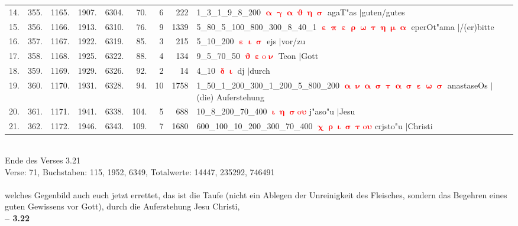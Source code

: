 \documentclass[a4paper,10pt,landscape]{article}
\begin{document}
\begin{tabular}{rrrrrrrrp{120mm}}
14.&355.&1165.&1907.&6304.&70.&6&222&1\_3\_1\_9\_8\_200 \textcolor{red}{$\boldsymbol{\upalpha\upgamma\upalpha\upvartheta\upeta\upsigma}$} agaT"as $|$guten/gutes\\
15.&356.&1166.&1913.&6310.&76.&9&1339&5\_80\_5\_100\_800\_300\_8\_40\_1 \textcolor{red}{$\boldsymbol{\upepsilon\uppi\upepsilon\uprho\upomega\uptau\upeta\upmu\upalpha}$} eperOt"ama $|$/(er)bitte\\
16.&357.&1167.&1922.&6319.&85.&3&215&5\_10\_200 \textcolor{red}{$\boldsymbol{\upepsilon\upiota\upsigma}$} ejs $|$vor/zu\\
17.&358.&1168.&1925.&6322.&88.&4&134&9\_5\_70\_50 \textcolor{red}{$\boldsymbol{\upvartheta\upepsilon\mathrm{o}\upnu}$} Teon $|$Gott\\
18.&359.&1169.&1929.&6326.&92.&2&14&4\_10 \textcolor{red}{$\boldsymbol{\updelta\upiota}$} dj $|$durch\\
19.&360.&1170.&1931.&6328.&94.&10&1758&1\_50\_1\_200\_300\_1\_200\_5\_800\_200 \textcolor{red}{$\boldsymbol{\upalpha\upnu\upalpha\upsigma\uptau\upalpha\upsigma\upepsilon\upomega\upsigma}$} anastaseOs $|$(die) Auferstehung\\
20.&361.&1171.&1941.&6338.&104.&5&688&10\_8\_200\_70\_400 \textcolor{red}{$\boldsymbol{\upiota\upeta\upsigma\mathrm{o}\upsilon}$} j"aso"u $|$Jesu\\
21.&362.&1172.&1946.&6343.&109.&7&1680&600\_100\_10\_200\_300\_70\_400 \textcolor{red}{$\boldsymbol{\upchi\uprho\upiota\upsigma\uptau\mathrm{o}\upsilon}$} crjsto"u $|$Christi\\
\end{tabular}\medskip \\
Ende des Verses 3.21\\
Verse: 71, Buchstaben: 115, 1952, 6349, Totalwerte: 14447, 235292, 746491\\
\\
welches Gegenbild auch euch jetzt errettet, das ist die Taufe (nicht ein Ablegen der Unreinigkeit des Fleisches, sondern das Begehren eines guten Gewissens vor Gott), durch die Auferstehung Jesu Christi,\\
\newpage 
{\bf -- 3.22}\\
\medskip \\
\end{document}
